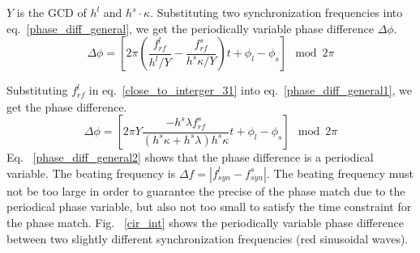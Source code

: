$Y$ is the GCD of $h^l$ and $h^s \cdot \kappa$. Substituting two synchronization frequencies into eq.~\ref{phase_diff_general}, we get the periodically variable phase difference $\Delta \phi$.
\begin{equation}
	\Delta \phi=[2\pi(\frac{f_{\mathit{rf}}^{l}}{h^{l}/Y}-\frac{f_{\mathit{rf}}^{s}}{h^{s}\kappa/Y})t+\phi_l-\phi_s] \mod 2\pi \label{phase_diff_general1}
\end{equation}

Substituting $f_{\mathit{rf}}^{l}$ in eq.~\ref{close_to_interger_31} into eq.~\ref{phase_diff_general1}, we get the phase difference.
\begin{equation}
	\Delta \phi=[2\pi Y\frac{-{h^{s}\lambda f_{\mathit{rf}}^{s}}}{(h^{s}\kappa+h^{s}\lambda)h^{s}\kappa}t+\phi_l-\phi_s] \mod 2\pi \label{phase_diff_general2}
\end{equation}
Eq. ~\ref{phase_diff_general2} shows that the phase difference is a periodical variable. The beating frequency is $\Delta f=|f_{\mathit{syn}}^{l}-f_{\mathit{syn}}^{s}|$. The beating frequency must not be too large in order to guarantee the precise of the phase match due to the periodical phase variable, but also not too small to satisfy the time constraint for the phase match. Fig. ~\ref{cir_int} shows the periodically variable phase difference between two slightly different synchronization frequencies (red sinusoidal waves).
 

%

